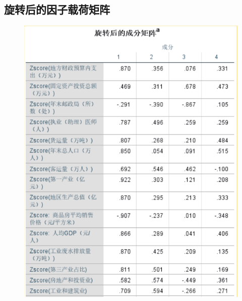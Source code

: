 \documentclass{whutmod}
\begin{document}
\subsection{旋转后的因子载荷矩阵}
\begin{figure}[H]
	\centering
	\includegraphics[width=\textwidth]{figures/3.png}
	
\end{figure}  
\end{document}
